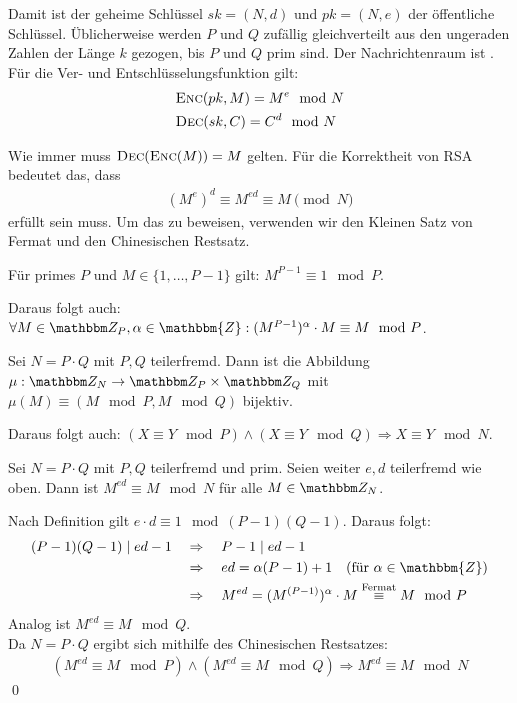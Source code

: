Damit ist der geheime Schlüssel $sk = (N, d)$ und $pk = (N, e)$ der öffentliche Schlüssel. Üblicherweise werden $P$ und $Q$ zufällig gleichverteilt aus den ungeraden Zahlen der Länge $k$ gezogen,
bis $P$ und $Q$ prim sind. Der Nachrichtenraum ist . Für die Ver- und Entschlüsselungsfunktion gilt:
\begin{align*}
	& \textsc{Enc}(pk, M) = M^e \mod N\\
	& \textsc{Dec}(sk, C) = C^d \mod N
\end{align*}

Wie immer muss $\textsc{Dec}(\textsc{Enc}(M)) = M$ gelten. Für die Korrektheit von RSA bedeutet das, dass
\begin{align*}
	(M^e)^d \equiv M^{ed} \equiv M \pmod N
\end{align*}
erfüllt sein muss. Um das zu beweisen, verwenden wir den Kleinen Satz von Fermat und den Chinesischen Restsatz.
\begin{theorem}
Für primes $P$ und $M \in \{1, \dotsc, P-1\}$ gilt: $M^{P-1} \equiv 1 \mod P$.
\end{theorem}
Daraus folgt auch: $\forall M \in \Z P, \alpha \in \mathbbm{Z} : (M^{P-1})^{\alpha} \cdot M \equiv M \mod P$.

\begin{theorem}
Sei $N = P \cdot Q$ mit $P, Q$ teilerfremd. Dann ist die Abbildung $\mu : \Z N \rightarrow \Z P \times \Z Q$ mit $\mu(M) \equiv (M \mod P, M \mod Q)$ bijektiv.
\end{theorem}
Daraus folgt auch: $(X \equiv Y \mod P) \land (X \equiv Y \mod Q) \Rightarrow X \equiv Y \mod N$.

\begin{theorem}
Sei $N = P \cdot Q$ mit $P, Q$ teilerfremd und prim. Seien weiter $e, d$ teilerfremd wie oben. Dann ist $M^{ed} \equiv M \mod N$ für alle $M \in \Z N$.
\end{theorem}

\begin{beweis}
Nach Definition gilt $e \cdot d \equiv 1 \mod (P-1)(Q-1)$. Daraus folgt:
\begin{align*}
(P-1)(Q-1) \mid ed - 1 \quad
& \Rightarrow \quad P-1 \mid ed - 1\\
& \Rightarrow \quad ed = \alpha (P-1) + 1 \quad (\text{für } \alpha \in \mathbbm{Z})\\
& \Rightarrow \quad M^{ed} = (M^{(P-1)})^{\alpha} \cdot M \stackrel{\text{Fermat}}\equiv M \mod P
\end{align*}
Analog ist $M^{ed} \equiv M \mod Q$.\\
Da $N = P \cdot Q$ ergibt sich mithilfe des Chinesischen Restsatzes:
\begin{align*}
(M^{ed} \equiv M \mod P) \land (M^{ed} \equiv M \mod Q) \Rightarrow M^{ed} \equiv M \mod N
\end{align*}
\qed
\end{beweis}

